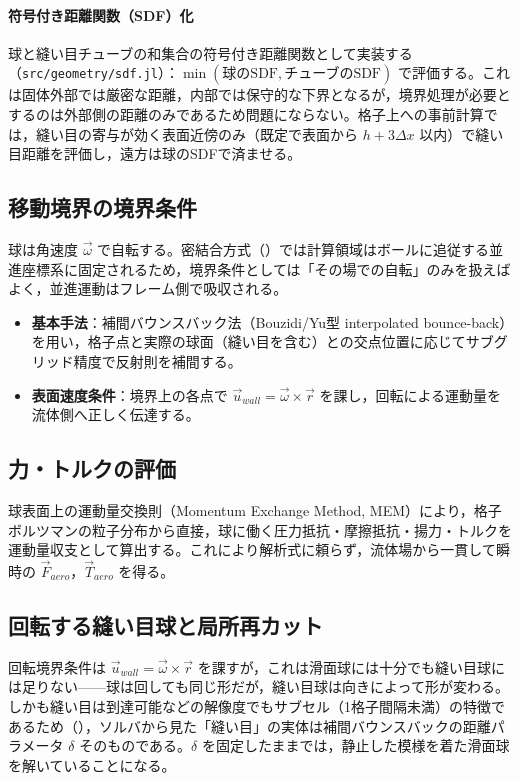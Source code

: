 \paragraph{符号付き距離関数（SDF）化}
球と縫い目チューブの和集合の符号付き距離関数として実装する（\texttt{src/geometry/sdf.jl}）：\(\min(\text{球のSDF}, \text{チューブのSDF})\) で評価する。これは固体外部では厳密な距離，内部では保守的な下界となるが，境界処理が必要とするのは外部側の距離のみであるため問題にならない。格子上への事前計算では，縫い目の寄与が効く表面近傍のみ（既定で表面から \(h+3\Delta x\) 以内）で縫い目距離を評価し，遠方は球のSDFで済ませる。

\subsection{移動境界の境界条件}

球は角速度 \(\vec\omega\) で自転する。密結合方式（）では計算領域はボールに追従する並進座標系に固定されるため，境界条件としては「その場での自転」のみを扱えばよく，並進運動はフレーム側で吸収される。

\begin{itemize}
	\item \textbf{基本手法}：補間バウンスバック法（Bouzidi/Yu型 interpolated bounce-back）を用い，格子点と実際の球面（縫い目を含む）との交点位置に応じてサブグリッド精度で反射則を補間する。
	\item \textbf{表面速度条件}：境界上の各点で \(\vec u_{wall}=\vec\omega\times\vec r\) を課し，回転による運動量を流体側へ正しく伝達する。
\end{itemize}

\subsection{力・トルクの評価}

球表面上の運動量交換則（Momentum Exchange Method, MEM）により，格子ボルツマンの粒子分布から直接，球に働く圧力抵抗・摩擦抵抗・揚力・トルクを運動量収支として算出する。これにより解析式に頼らず，流体場から一貫して瞬時の \(\vec F_{aero}\)，\(\vec T_{aero}\) を得る。

\subsection{回転する縫い目球と局所再カット}
\label{sec:recut}

回転境界条件は \(\vec u_{wall}=\vec\omega\times\vec r\) を課すが，これは滑面球には十分でも縫い目球には足りない——球は回しても同じ形だが，縫い目球は向きによって形が変わる。しかも縫い目は到達可能などの解像度でもサブセル（1格子間隔未満）の特徴であるため（），ソルバから見た「縫い目」の実体は補間バウンスバックの距離パラメータ \(\delta\) そのものである。\(\delta\) を固定したままでは，静止した模様を着た滑面球を解いていることになる。

